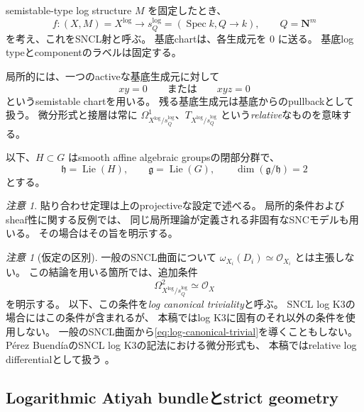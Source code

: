 \documentclass[uplatex,dvipdfmx,11pt]{jsarticle}
\numberwithin{equation}{section}
\theoremstyle{plain}
\theoremstyle{definition}
\theoremstyle{remark}
\newtheorem{remark}[theorem]{注意}
\DeclareMathOperator{\Spec}{Spec}
\DeclareMathOperator{\Lie}{Lie}
\newcommand{\OO}{\mathcal O}
\newcommand{\NN}{\mathbf N}
\newcommand{\g}{\mathfrak g}
\newcommand{\h}{\mathfrak h}
\newcommand{\sQ}{s_Q^{\log}}
\newcommand{\Xlog}{X^{\log}}
\newcommand{\Tlog}{T_{X^{\log}/s_Q^{\log}}}
\newcommand{\Omlog}{\Omega^1_{X^{\log}/s_Q^{\log}}}
\begin{document}
semistable-type log structure \(M\) を固定したとき、
\[
f:(X,M)=\Xlog\longrightarrow
\sQ=(\Spec k,Q\to k),\qquad Q=\NN^m
\]
を考え、これをSNCL射と呼ぶ。
基底chartは、各生成元を \(0\) に送る。
基底log typeとcomponentのラベルは固定する。

局所的には、一つのactiveな基底生成元に対して
\[
xy=0\qquad\text{または}\qquad xyz=0
\]
というsemistable chartを用いる。
残る基底生成元は基底からのpullbackとして扱う。
微分形式と接層は常に
\(\Omlog\)、\(\Tlog\) という\emph{relative}なものを意味する。

以下、\(H\subset G\) はsmooth affine algebraic groupsの閉部分群で、
\[
\h=\Lie(H),\qquad \g=\Lie(G),\qquad
\dim(\g/\h)=2
\]
とする。

\begin{remark}
\label{rem:scope-local}
貼り合わせ定理は上のprojectiveな設定で述べる。
局所的条件およびsheaf性に関する反例では、
同じ局所理論が定義される非固有なSNCモデルも用いる。
その場合はその旨を明示する。
\end{remark}

\begin{remark}[仮定の区別]
\label{rem:log-k3}
一般のSNCL曲面について
\(\omega_{X_i}(D_i)\simeq\OO_{X_i}\) とは主張しない。
この結論を用いる箇所では、追加条件
\begin{equation}
\label{eq:log-canonical-trivial}
\Omega^2_{X^{\log}/s_Q^{\log}}\simeq\OO_X
\end{equation}
を明示する。
以下、この条件を\emph{log canonical triviality}と呼ぶ。
SNCL log K3の場合にはこの条件が含まれるが、
本稿ではlog K3に固有のそれ以外の条件を使用しない。
一般のSNCL曲面から\eqref{eq:log-canonical-trivial}を導くこともしない。
Pérez BuendíaのSNCL log K3の記法における微分形式も、
本稿ではrelative log differentialとして扱う
\cite{PB}。
\end{remark}

\subsection{Logarithmic Atiyah bundleとstrict geometry}
\end{document}
